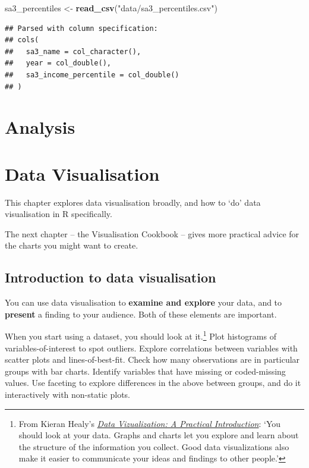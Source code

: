 \documentclass[]{book}
\newenvironment{Shaded}{\begin{snugshade}}{\end{snugshade}}
\newcommand{\KeywordTok}[1]{\textcolor[rgb]{0.13,0.29,0.53}{\textbf{#1}}}
\newcommand{\NormalTok}[1]{#1}
\newcommand{\StringTok}[1]{\textcolor[rgb]{0.31,0.60,0.02}{#1}}
\begin{document}
\begin{Shaded}
\begin{Highlighting}[]
\NormalTok{sa3_percentiles <-}\StringTok{ }\KeywordTok{read_csv}\NormalTok{(}\StringTok{"data/sa3_percentiles.csv"}\NormalTok{)}
\end{Highlighting}
\end{Shaded}

\begin{verbatim}
## Parsed with column specification:
## cols(
##   sa3_name = col_character(),
##   year = col_double(),
##   sa3_income_percentile = col_double()
## )
\end{verbatim}

\hypertarget{analysis}{%
\chapter{Analysis}\label{analysis}}

\hypertarget{data-visualisation}{%
\chapter{Data Visualisation}\label{data-visualisation}}

This chapter explores data visualisation broadly, and how to `do' data visualisation in R specifically.

The next chapter -- the Visualisation Cookbook -- gives more practical advice for the charts you might want to create.

\hypertarget{introduction-to-data-visualisation}{%
\section{Introduction to data visualisation}\label{introduction-to-data-visualisation}}

You can use data visualisation to \textbf{examine and explore} your data, and to \textbf{present} a finding to your audience. Both of these elements are important.

When you start using a dataset, you should look at it.\footnote{From Kieran Healy's \href{https://socviz.co/}{\emph{Data Vizualization: A Practical Introduction}}: `You should look at your data. Graphs and charts let you explore and learn about the structure of the information you collect. Good data visualizations also make it easier to communicate your ideas and findings to other people.'} Plot histograms of variables-of-interest to spot outliers. Explore correlations between variables with scatter plots and lines-of-best-fit. Check how many observations are in particular groups with bar charts. Identify variables that have missing or coded-missing values. Use faceting to explore differences in the above between groups, and do it interactively with non-static plots.
\end{document}
